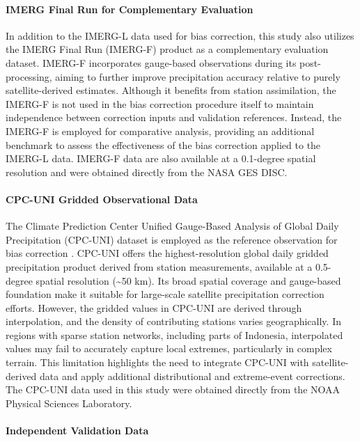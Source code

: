 \documentclass[11pt,a4paper]{article}
\begin{document}
\paragraph{IMERG Final Run for Complementary
Evaluation}

In addition to the IMERG-L data used for bias correction, this study
also utilizes the IMERG Final Run (IMERG-F) product as a complementary
evaluation dataset. IMERG-F incorporates gauge-based observations during
its post-processing, aiming to further improve precipitation accuracy
relative to purely satellite-derived estimates. Although it benefits
from station assimilation, the IMERG-F is not used in the bias
correction procedure itself to maintain independence between correction
inputs and validation references. Instead, the IMERG-F is employed for
comparative analysis, providing an additional benchmark to assess the
effectiveness of the bias correction applied to the IMERG-L data.
IMERG-F data are also available at a 0.1-degree spatial resolution and
were obtained directly from the NASA GES DISC.

\paragraph{CPC-UNI Gridded Observational
Data}\label{cpc-uni-gridded-observational-data}

The Climate Prediction Center Unified Gauge-Based Analysis of Global
Daily Precipitation (CPC-UNI) dataset is employed as the reference
observation for bias correction \cite{ref13,ref18}. CPC-UNI offers the
highest-resolution global daily gridded precipitation product derived
from station measurements, available at a 0.5-degree spatial resolution
(\textasciitilde50 km). Its broad spatial coverage and gauge-based
foundation make it suitable for large-scale satellite precipitation
correction efforts. However, the gridded values in CPC-UNI are derived
through interpolation, and the density of contributing stations varies
geographically. In regions with sparse station networks, including parts
of Indonesia, interpolated values may fail to accurately capture local
extremes, particularly in complex terrain. This limitation highlights
the need to integrate CPC-UNI with satellite-derived data and apply
additional distributional and extreme-event corrections. The CPC-UNI
data used in this study were obtained directly from the NOAA Physical
Sciences Laboratory.

\paragraph{Independent Validation
Data}\label{independent-validation-data}
\end{document}
